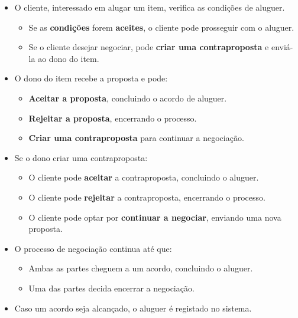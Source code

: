 \documentclass[a4paper, 12pt]{article} %
\begin{document}
\begin{itemize}
	\item O cliente, interessado em alugar um item, verifica as condições de aluguer.
	\begin{itemize}
		\item Se as \textbf{condições} forem \textbf{aceites}, o cliente pode prosseguir com o aluguer.
		\item Se o cliente desejar negociar, pode \textbf{criar uma contraproposta} e enviá-la ao dono do item.
	\end{itemize}
	\item O dono do item recebe a proposta e pode:
	\begin{itemize}
		\item \textbf{Aceitar a proposta}, concluindo o acordo de aluguer.
		\item \textbf{Rejeitar a proposta}, encerrando o processo.
		\item \textbf{Criar uma contraproposta} para continuar a negociação.
	\end{itemize}
	\item Se o dono criar uma contraproposta:
	\begin{itemize}
		\item O cliente pode \textbf{aceitar} a contraproposta, concluindo o aluguer.
		\item O cliente pode \textbf{rejeitar} a contraproposta, encerrando o processo.
		\item O cliente pode optar por \textbf{continuar a negociar}, enviando uma nova proposta.

	\end{itemize}
	\item O processo de negociação continua até que:
	\begin{itemize}
		\item Ambas as partes cheguem a um acordo, concluindo o aluguer.
		\item Uma das partes decida encerrar a negociação.
	\end{itemize}
	\item Caso um acordo seja alcançado, o aluguer é registado no sistema.
\end{itemize}
\end{document}
